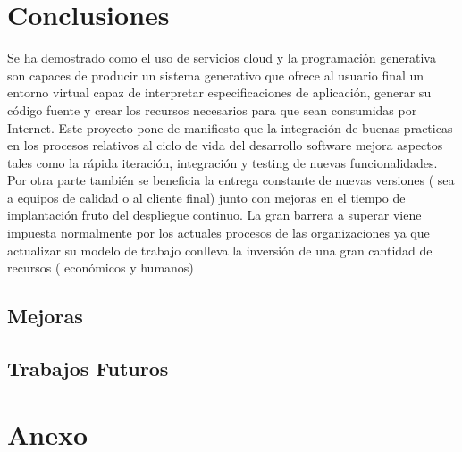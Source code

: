\documentclass[a4paper,11pt]{book}
\begin{document}
\chapter{Conclusiones}

Se ha demostrado como el uso de servicios cloud y la programación generativa son capaces de producir un sistema generativo que ofrece al usuario final un entorno virtual capaz de interpretar especificaciones de aplicación, generar su código fuente y crear los recursos necesarios para que sean consumidas por Internet.   Este proyecto pone de manifiesto que la integración de buenas practicas en los procesos relativos al ciclo de vida del desarrollo software mejora aspectos tales como la rápida iteración, integración y testing de nuevas funcionalidades. Por otra parte también se beneficia la entrega constante de nuevas versiones ( sea a equipos de calidad o al cliente final) junto con mejoras en el tiempo de implantación fruto del despliegue continuo. La gran barrera a superar viene impuesta normalmente por los actuales procesos de las organizaciones ya que actualizar su modelo de trabajo conlleva la inversión de una gran cantidad de recursos ( económicos y humanos) 

\section{Mejoras}

\section{Trabajos Futuros}


\chapter{ Anexo}

\thispagestyle{empty}
\end{document}
